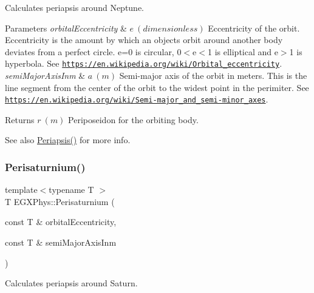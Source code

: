 Calculates periapsis around Neptune. 


\begin{DoxyParams}{Parameters}
{\em orbital\+Eccentricity} & $ e\ (dimensionless)$ Eccentricity of the orbit. Eccentricity is the amount by which an objects orbit around another body deviates from a perfect circle. e=0 is circular, 0$<$e$<$1 is elliptical and e$>$1 is hyperbola. See \href{https://en.wikipedia.org/wiki/Orbital_eccentricity}{\tt https\+://en.\+wikipedia.\+org/wiki/\+Orbital\+\_\+eccentricity}. \\
\hline
{\em semi\+Major\+Axis\+Inm} & $ a\ (m)$ Semi-\/major axis of the orbit in meters. This is the line segment from the center of the orbit to the widest point in the perimiter. See \href{https://en.wikipedia.org/wiki/Semi-major_and_semi-minor_axes}{\tt https\+://en.\+wikipedia.\+org/wiki/\+Semi-\/major\+\_\+and\+\_\+semi-\/minor\+\_\+axes}. \\
\hline
\end{DoxyParams}
\begin{DoxyReturn}{Returns}
$ r\ (m)$ Periposeidon for the orbiting body. 
\end{DoxyReturn}
\begin{DoxySeeAlso}{See also}
\mbox{\hyperlink{group___e_g_x_phys-_periapsis_gad487212733711bc2ce73c8137c9309c3}{Periapsis()}} for more info. 
\end{DoxySeeAlso}
\mbox{\label{group___e_g_x_phys-_periapsis_ga9e41853412b564c33a192f7335e4f6fe}} 
\subsubsection{\texorpdfstring{Perisaturnium()}{Perisaturnium()}}
{\footnotesize\ttfamily template$<$typename T $>$ \\
T E\+G\+X\+Phys\+::\+Perisaturnium (\begin{DoxyParamCaption}\item[{const T \&}]{orbital\+Eccentricity,  }\item[{const T \&}]{semi\+Major\+Axis\+Inm }\end{DoxyParamCaption})}



Calculates periapsis around Saturn. 


